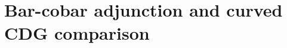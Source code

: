 \chapter{Bar-cobar adjunction and curved CDG comparison}
\label{chap:bar-cobar-adjunction}

\providecommand{\Kosz}{\mathsf{Kosz}}
\providecommand{\co}{\mathrm{co}}

\providecommand{\openFactCat}{\cC^{\mathrm{open}}}
\providecommand{\logCurve}{(X, D, \tau)}
\providecommand{\kappaChHodge}{\kappa_{\mathrm{ch}}^{\mathrm{Hodge}}}
\providecommand{\primPkgBicolour}{\bigl(\openFactCat|_{\logCurve},\, \cD^{\mathrm{cl}}|_{X};\, b,\, A_b,\, F^{\mathrm{cl}};\, \HalfBraid,\, \mathrm{tr}^{\mathrm{cl}}_{X};\, \TraceC\bigr)}
\providecommand{\bulkChirHoch}[1]{\mathrm{HH}^\bullet_{\mathrm{ch}}\bigl(#1\bigr)}
\providecommand{\HalfBraid}{\beta^{\mathrm{half}}}
\providecommand{\TraceC}{\mathrm{tr}^{\mathrm{op}}_{\openFactCat}}

